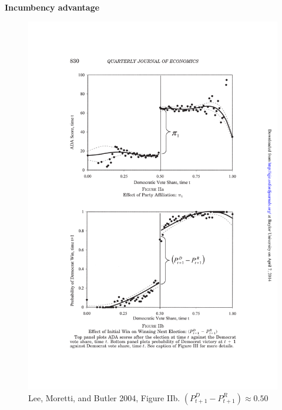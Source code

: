 \documentclass[notes=show]{beamer}
\begin{document}
\begin{frame}[plain]
	\begin{center}
	\textbf{Incumbency advantage}
	\end{center}
	
	\begin{figure}
	\includegraphics[scale=0.75]{./lecture_includes/lee_fig2b.pdf}
	\caption{Lee, Moretti, and Butler 2004, Figure IIb. $(P_{t+1}^D - P_{t+1}^R)\approx 0.50$}
	\end{figure}
\end{frame}
\end{document}
